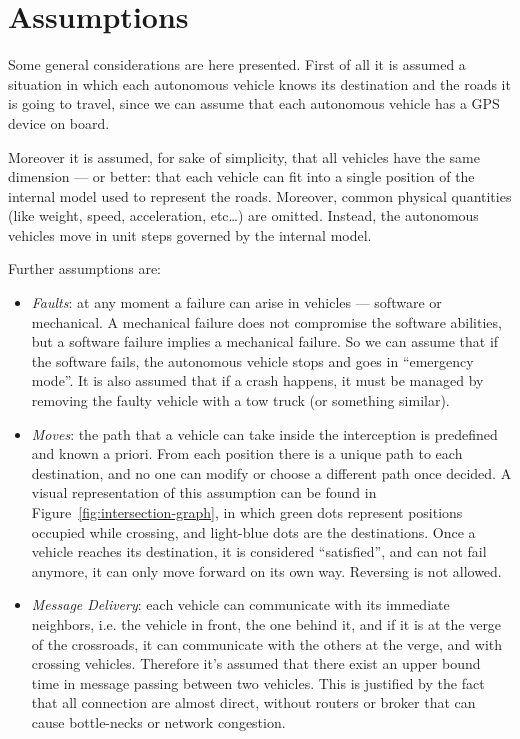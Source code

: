 \documentclass{memoir}
\begin{document}
\section{Assumptions}

Some general considerations are here presented. First of all it is assumed a situation in which each autonomous vehicle knows its destination and the roads it is going to travel, since we can assume that each autonomous vehicle has a GPS device on board.

Moreover it is assumed, for sake of simplicity, that all vehicles have the same dimension --- or better: that each vehicle can fit into a single position of the internal model used to represent the roads. Moreover, common physical quantities (like weight, speed, acceleration, etc\dots) are omitted. Instead, the autonomous vehicles move in unit steps governed by the internal model.
\newline

Further assumptions are:

\begin{itemize}
	\item \emph{Faults}: at any moment a failure can arise in vehicles --- software or mechanical. A mechanical failure does not compromise the software abilities, but a software failure implies a mechanical failure. So we can assume that if the software fails, the autonomous vehicle stops and goes in ``emergency mode''. It is also assumed that if a crash happens, it must be managed by removing the faulty vehicle with a tow truck (or something similar).
	\item \emph{Moves}: the path that a vehicle can take inside the interception is predefined and known a priori. From each position there is a unique path to each destination, and no one can modify or choose a different path once decided. A visual representation of this assumption can be found in Figure~\ref{fig:intersection-graph}, in which green dots represent positions occupied while crossing, and light-blue dots are the destinations. Once a vehicle reaches its destination, it is considered ``satisfied'', and can not fail anymore, it can only move forward on its own way. Reversing is not allowed.
	\item \emph{Message Delivery}: each vehicle can communicate with its immediate neighbors, i.e. the vehicle in front, the one behind it, and if it is at the verge of the crossroads, it can communicate with the others at the verge, and with crossing vehicles. Therefore it's assumed that there exist an upper bound time in message passing between two vehicles. This is justified by the fact that all connection are almost direct, without routers or broker that can cause bottle-necks or network congestion.
\end{itemize}
\end{document}
